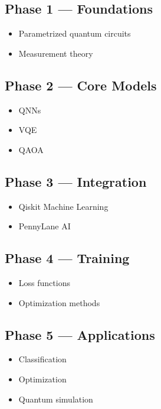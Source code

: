 \subsection*{Phase 1 --- Foundations}
\begin{itemize}
\item Parametrized quantum circuits
\item Measurement theory
\end{itemize}

\subsection*{Phase 2 --- Core Models}
\begin{itemize}
\item QNNs
\item VQE
\item QAOA
\end{itemize}

\subsection*{Phase 3 --- Integration}
\begin{itemize}
\item Qiskit Machine Learning
\item PennyLane AI
\end{itemize}

\subsection*{Phase 4 --- Training}
\begin{itemize}
\item Loss functions
\item Optimization methods
\end{itemize}

\subsection*{Phase 5 --- Applications}
\begin{itemize}
\item Classification
\item Optimization
\item Quantum simulation
\end{itemize}